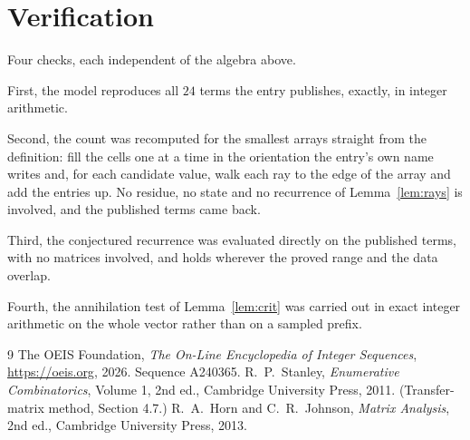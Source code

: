 \documentclass[11pt,a4paper]{article}
\theoremstyle{plain}
\theoremstyle{definition}
\begin{document}
\section{Verification}

Four checks, each independent of the algebra above.

First, the model reproduces all $24$ terms the entry publishes, exactly, in integer
arithmetic.

Second, the count was recomputed for the smallest arrays straight from the definition: fill the
cells one at a time in the orientation the entry's own name writes and, for each candidate
value, walk each ray to the edge of the array and add the entries up. No residue, no state and
no recurrence of Lemma~\ref{lem:rays} is involved, and the published terms came back.

Third, the conjectured recurrence was evaluated directly on the published terms, with no
matrices involved, and holds wherever the proved range and the data overlap.

Fourth, the annihilation test of Lemma~\ref{lem:crit} was carried out in exact integer
arithmetic on the whole vector rather than on a sampled prefix.

\begin{thebibliography}{9}
 The OEIS Foundation, \emph{The On-Line Encyclopedia of Integer
Sequences}, \url{https://oeis.org}, 2026. Sequence A240365.
 R.~P.~Stanley, \emph{Enumerative Combinatorics}, Volume 1, 2nd ed.,
Cambridge University Press, 2011. (Transfer-matrix method, Section 4.7.)
 R.~A.~Horn and C.~R.~Johnson, \emph{Matrix Analysis}, 2nd ed., Cambridge
University Press, 2013.
\end{thebibliography}
\end{document}
